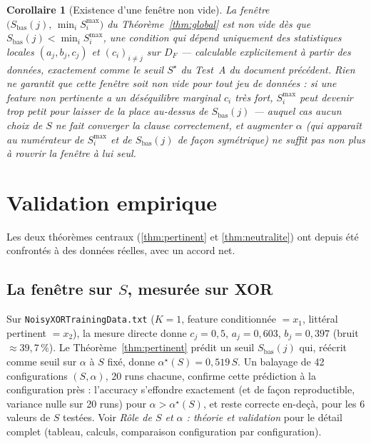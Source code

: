 \documentclass[12pt,a4paper]{article}
\newtheorem{corollary}[theorem]{Corollaire}
\theoremstyle{remark}
\newcommand{\DF}{D_F}
\begin{document}
\begin{corollary}[Existence d'une fenêtre non vide]
La fenêtre $\bigl(S_{\text{bas}}(j),\,\min_i S_i^{\max}\bigr)$ du
Théorème~\ref{thm:global} est non vide dès que
$S_{\text{bas}}(j) < \min_i S_i^{\max}$, une condition qui dépend uniquement des
statistiques locales $(a_j,b_j,c_j)$ et $(c_i)_{i\ne j}$ sur $\DF$ --- calculable
explicitement à partir des données, exactement comme le seuil $S^\star$ du
Test~A du document précédent. Rien ne garantit que cette fenêtre soit non vide
pour tout jeu de données : si une feature non pertinente a un déséquilibre
marginal $c_i$ très fort, $S_i^{\max}$ peut devenir trop petit pour laisser de la
place au-dessus de $S_{\text{bas}}(j)$ --- auquel cas \emph{aucun} choix de $S$ ne
fait converger la clause correctement, et augmenter $\alpha$ (qui apparaît au
numérateur de $S_i^{\max}$ et de $S_{\text{bas}}(j)$ de façon symétrique) ne
suffit pas non plus à rouvrir la fenêtre à lui seul.
\end{corollary}

\section{Validation empirique}\label{sec:validation}

Les deux théorèmes centraux (\ref{thm:pertinent} et \ref{thm:neutralite}) ont
depuis été confrontés à des données réelles, avec un accord net.

\subsection{La fenêtre sur $S$, mesurée sur XOR}

Sur \texttt{NoisyXORTrainingData.txt} ($K=1$, feature conditionnée $=x_1$,
littéral pertinent $=x_2$), la mesure directe donne $c_j=0{,}5$, $a_j=0{,}603$,
$b_j=0{,}397$ (bruit $\approx 39{,}7\,\%$). Le Théorème~\ref{thm:pertinent}
prédit un seuil $S_{\text{bas}}(j)$ qui, réécrit comme seuil sur $\alpha$ à $S$
fixé, donne $\alpha^\star(S)=0{,}519\,S$. Un balayage de 42 configurations
$(S,\alpha)$, 20 runs chacune, confirme cette prédiction à la configuration
près : l'accuracy s'effondre exactement (et de façon reproductible, variance
nulle sur 20 runs) pour $\alpha>\alpha^\star(S)$, et reste correcte en-deçà,
pour les 6 valeurs de $S$ testées. Voir
\textit{Rôle de $S$ et $\alpha$ : théorie et validation} pour le détail complet
(tableau, calculs, comparaison configuration par configuration).
\end{document}
